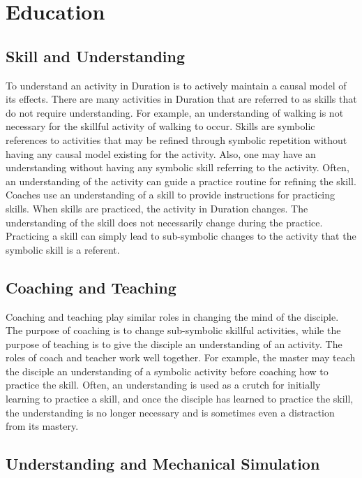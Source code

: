 \chapter{Education}
\label{chapter:education}

\section{Skill and Understanding}

To understand an activity in Duration is to actively maintain a causal
model of its effects.  There are many activities in Duration that are
referred to as skills that do not require understanding.  For example,
an understanding of walking is not necessary for the skillful activity
of walking to occur.  Skills are symbolic references to activities
that may be refined through symbolic repetition without having any
causal model existing for the activity.  Also, one may have an
understanding without having any symbolic skill referring to the
activity.  Often, an understanding of the activity can guide a
practice routine for refining the skill.  Coaches use an understanding
of a skill to provide instructions for practicing skills.  When skills
are practiced, the activity in Duration changes.  The understanding of
the skill does not necessarily change during the practice.  Practicing
a skill can simply lead to sub-symbolic changes to the activity that
the symbolic skill is a referent.

\section{Coaching and Teaching}

Coaching and teaching play similar roles in changing the mind of the
disciple.  The purpose of coaching is to change sub-symbolic skillful
activities, while the purpose of teaching is to give the disciple an
understanding of an activity.  The roles of coach and teacher work
well together.  For example, the master may teach the disciple an
understanding of a symbolic activity before coaching how to practice
the skill.  Often, an understanding is used as a crutch for initially
learning to practice a skill, and once the disciple has learned to
practice the skill, the understanding is no longer necessary and is
sometimes even a distraction from its mastery.

\section{Understanding and Mechanical Simulation}

